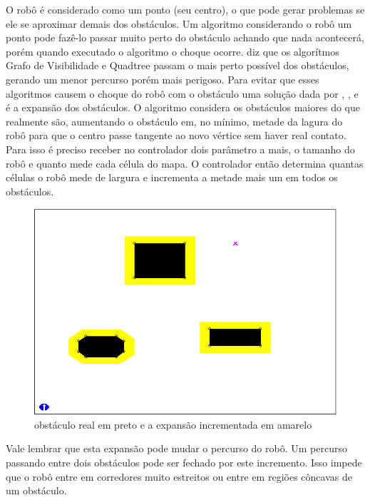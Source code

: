 O robô é considerado como um ponto (seu centro), o que pode gerar problemas se ele se aproximar demais dos obstáculos. Um algoritmo considerando o robô um ponto pode fazê-lo passar muito perto do obstáculo achando que nada acontecerá, porém quando executado o algoritmo o choque ocorre. \cite{Guzman2008} diz que os algorítmos Grafo de Visibilidade e Quadtree passam o mais perto possível dos obstáculos, gerando um menor percurso porém mais perigoso. Para evitar que esses algoritmos causem o choque do robô com o obstáculo uma solução dada por \cite{Souza2008}, \cite{Guzman2008}, \cite{Siegwart2004} e \cite{Thomsen2010} é a expansão dos obstáculos. O algoritmo considera os obstáculos maiores do que realmente são, aumentando o obstáculo em, no mínimo, metade da lagura do robô para que o centro passe tangente ao novo vértice sem haver real contato. Para isso é preciso receber no controlador dois parâmetro a mais, o tamanho do robô e quanto mede cada célula do mapa. O controlador então determina quantas células o robô mede de largura e incrementa a metade mais um em todos os obstáculos.

\begin{figure}[h]
	\centering
	\label{fig28}
		\includegraphics[keepaspectratio=true,scale=0.5]{figuras/expansao.png}
	\caption{obstáculo real em preto e a expansão incrementada em amarelo \cite{MRIT_SITE}}
\end{figure}

Vale lembrar que esta expansão pode mudar o percurso do robô. Um percurso passando entre dois obstáculos pode ser fechado por este incremento. Isso impede que o robô entre em corredores muito estreitos ou entre em regiões côncavas de um obstáculo.


